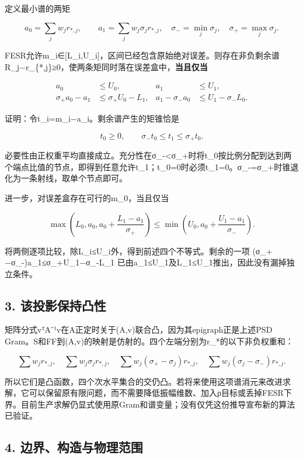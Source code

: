 \documentclass[
  10pt,
  a4paper,
]{article}
\begin{document}
定义最小谱的两矩

\[
a_0=\sum_jw_jr_{*,j},\qquad a_1=\sum_jw_j\sigma_jr_{*,j},
\quad \sigma_-=\min_j\sigma_j,\quad\sigma_+=\max_j\sigma_j.
\]

FESR允许m\_i∈{[}L\_i,U\_i{]}，区间已经包含原始绝对误差。则存在非负剩余谱R\_j−r\_\{*,j\}≥0，使两条矩同时落在误差盒中，\textbf{当且仅当}

\[
\begin{aligned}
a_0&\le U_0, &a_1&\le U_1,\\
\sigma_+a_0-a_1&\le\sigma_+U_0-L_1,
&a_1-\sigma_-a_0&\le U_1-\sigma_-L_0.
\end{aligned}
\]

证明：令t\_i=m\_i−a\_i。剩余谱产生的矩锥恰是

\[
t_0\ge0,\qquad \sigma_-t_0\le t_1\le\sigma_+t_0.
\]

必要性由正权重平均直接成立。充分性在σ\_-\textless σ\_+时将t\_0按比例分配到达到两个端点比值的节点，即得到任意允许t\_1；t\_0=0时必须t\_1=0。σ\_-=σ\_+时锥退化为一条射线，取单个节点即可。

进一步，对误差盒存在可行的m\_0，当且仅当

\[
\max\!\left(L_0,a_0,a_0+\frac{L_1-a_1}{\sigma_+}\right)
\le
\min\!\left(U_0,a_0+\frac{U_1-a_1}{\sigma_-}\right).
\]

将两侧逐项比较，除L\_i≤U\_i外，得到前述四个不等式。剩余的一项
(σ\_+−σ\_-)a\_1≤σ\_+U\_1−σ\_-L\_1
已由a\_1≤U\_1及L\_1≤U\_1推出，因此没有漏掉独立条件。

\subsection{3.
该投影保持凸性}\label{ux8be5ux6295ux5f71ux4fddux6301ux51f8ux6027}

矩阵分式vᵀA⁻¹v在A正定时关于(A,v)联合凸，因为其epigraph正是上述PSD
Gram。S和FF到(A,v)的映射是仿射的。四个左端分别为r\_*的以下非负权重和：

\[
\sum w_jr_{*,j},\quad\sum w_j\sigma_jr_{*,j},\quad
\sum w_j(\sigma_+-\sigma_j)r_{*,j},\quad
\sum w_j(\sigma_j-\sigma_-)r_{*,j}.
\]

所以它们是凸函数，四个次水平集合的交仍凸。若将来使用这项谱消元来改进求解，它可以保留原有限问题，而不需要降低振幅维数、加入ρ目标或丢掉FESR下界。目前生产求解仍显式使用原Gram和谱变量；没有仅凭这份推导宣布新的算法已验证。

\subsection{4.
边界、构造与物理范围}\label{ux8fb9ux754cux6784ux9020ux4e0eux7269ux7406ux8303ux56f4}
\end{document}
